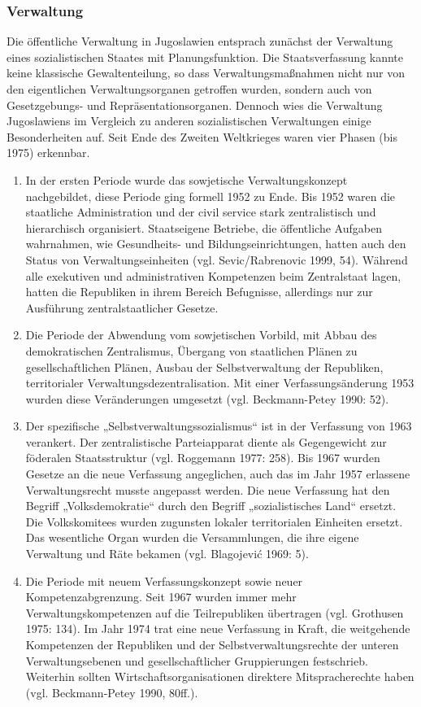 \subsubsection{Verwaltung}

Die öffentliche Verwaltung in Jugoslawien entsprach zunächst der Verwaltung eines sozialistischen Staates mit Planungsfunktion. Die Staatsverfassung kannte keine klassische Gewaltenteilung, so dass Verwaltungsmaßnahmen nicht nur von den eigentlichen Verwaltungsorganen getroffen wurden, sondern auch von Gesetzgebungs- und Repräsentationsorganen. Dennoch wies die Verwaltung Jugoslawiens im Vergleich zu anderen sozialistischen Verwaltungen einige Besonderheiten auf. Seit Ende des Zweiten Weltkrieges waren vier Phasen (bis 1975) erkennbar.
\begin{enumerate}[label={\roman*}:,align=left,  leftmargin=*]
\item  In der ersten Periode wurde das sowjetische Verwaltungskonzept nachgebildet, diese Periode ging formell 1952 zu Ende. Bis 1952 waren die staatliche Administration und der civil service stark zentralistisch und hierarchisch organisiert. Staatseigene Betriebe, die öffentliche Aufgaben wahrnahmen, wie Gesundheits- und Bildungseinrichtungen, hatten auch den Status von Verwaltungseinheiten (vgl. Sevic/Rabrenovic 1999, 54). Während alle exekutiven und administrativen Kompetenzen beim Zentralstaat lagen, hatten die Republiken in ihrem Bereich Befugnisse, allerdings nur zur Ausführung zentralstaatlicher Gesetze.
\item Die Periode der Abwendung vom sowjetischen Vorbild, mit Abbau des demokratischen Zentralismus, Übergang von staatlichen Plänen zu gesellschaftlichen Plänen, Ausbau der Selbstverwaltung der Republiken, territorialer Verwaltungsdezentralisation. Mit einer Verfassungsänderung 1953 wurden diese Veränderungen umgesetzt (vgl. Beckmann-Petey 1990: 52).
\item Der spezifische „Selbstverwaltungssozialismus“ ist in der Verfassung von 1963 verankert. Der zentralistische Parteiapparat diente als Gegengewicht zur föderalen Staatsstruktur (vgl. Roggemann 1977: 258). Bis 1967 wurden Gesetze an die neue Verfassung angeglichen, auch das im Jahr 1957 erlassene Verwaltungsrecht musste angepasst werden. Die neue Verfassung hat den Begriff „Volksdemokratie“ durch den Begriff „sozialistisches Land“ ersetzt. Die Volkskomitees wurden zugunsten lokaler territorialen Einheiten ersetzt. Das wesentliche Organ wurden die Versammlungen, die ihre eigene Verwaltung und Räte bekamen (vgl. Blagojević 1969: 5). 
\item Die Periode mit neuem Verfassungskonzept sowie neuer Kompetenzabgrenzung. Seit 1967 wurden immer mehr Verwaltungskompetenzen auf die Teilrepubliken übertragen (vgl. Grothusen 1975: 134). Im Jahr 1974 trat eine neue Verfassung in Kraft, die weitgehende Kompetenzen der Republiken und der Selbstverwaltungsrechte der unteren Verwaltungsebenen und gesellschaftlicher Gruppierungen festschrieb. Weiterhin sollten Wirtschaftsorganisationen direktere Mitspracherechte haben (vgl. Beckmann-Petey 1990, 80ff.). 
\end{enumerate}

